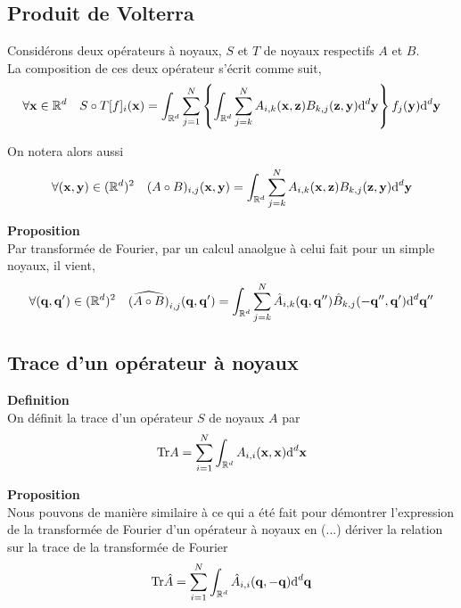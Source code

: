 \documentclass[10pt]{article}
\begin{document}
\vspace*{11pt}

\subsection{Produit de Volterra}

Considérons deux opérateurs à noyaux, $S$ et $T$ de noyaux respectifs $A$ et $B$. \\
La composition de ces deux opérateur s'écrit comme suit,
\begin{equation}
  \forall {\bf x} \in \mathbb{R}^d \quad S \circ T [f]_i ({\bf x}) = \int_{\mathbb{R}^d}  \sum_{j=1}^{N} \left\{ \int_{\mathbb{R}^d} \sum_{j=k}^{N}A_{i,k}({\bf x}, {\bf z})B_{k,j}({\bf z}, {\bf y})  \text{d}^d {\bf y} \right\} f_j({\bf y})  \text{d}^d {\bf y}
\end{equation}

On notera alors aussi
\begin{equation}
    \forall ({\bf x}, {\bf y}) \in (\mathbb{R}^d)^2 \quad (A \circ B)_{i,j} ({\bf x}, {\bf y}) = \int_{\mathbb{R}^d} \sum_{j=k}^{N}A_{i,k}({\bf x}, {\bf z})B_{k,j}({\bf z}, {\bf y})  \text{d}^d {\bf y} 
\end{equation}

\textbf{Proposition}\\
Par transformée de Fourier, par un calcul anaolgue à celui fait pour un simple noyaux, il vient,
\begin{equation}
\forall ({\bf q}, {\bf q}') \in (\mathbb{R}^d)^2 \quad\widehat{(A \circ B)}_{i,j}({\bf q}, {\bf q}') =\int_{\mathbb{R}^d} \sum_{j=k}^{N}\hat{A}_{i,k}({\bf q}, {\bf q}'')\hat{B}_{k,j}(-{\bf q}'', {\bf q}')  \text{d}^d {\bf q}'' 
\end{equation}



\vspace*{11pt}

\subsection{Trace d'un opérateur à noyaux}

\textbf{Definition}\\
On définit la trace d'un opérateur $S$ de noyaux $A$ par
\begin{equation}
  \text{Tr} A = \sum_{i=1}^{N} \int_{\mathbb{R}^d} A_{i,i}({\bf x},{\bf x}) \text{d}^d {\bf x} 
\end{equation}


\textbf{Proposition}\\
Nous pouvons de manière similaire à ce qui a été fait pour démontrer l'expression de la transformée de Fourier d'un opérateur à noyaux en (...) dériver la relation sur la trace de la transformée de Fourier
\begin{equation}
  \text{Tr} \hat{A} = \sum_{i=1}^{N} \int_{\mathbb{R}^d} \hat{A}_{i,i}({\bf q},-{\bf q}) \text{d}^d {\bf q} 
\end{equation}
\end{document}
